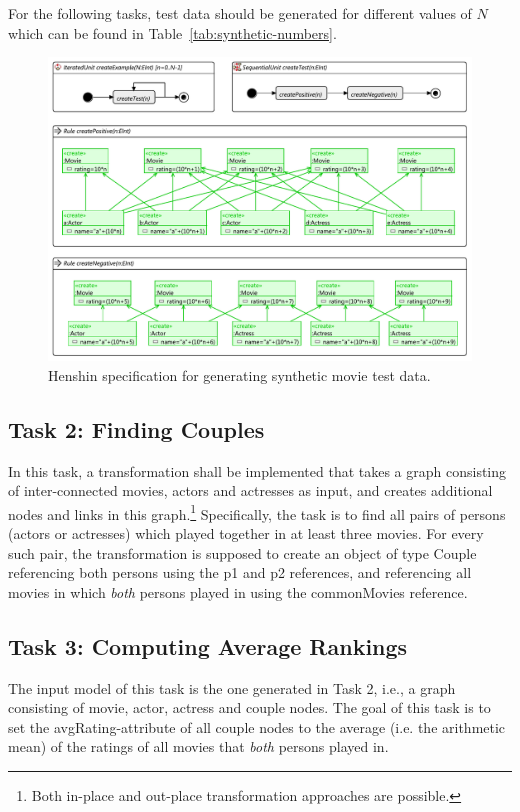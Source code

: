 \documentclass[a4paper,11pt]{article}
\newcommand{\p}[1]{\textsf{\small #1}}
\begin{document}
For the following tasks, test data should be generated for different values 
of $N$ which can be found in Table~\ref{tab:synthetic-numbers}.


\begin{figure}[p]
\centering
\includegraphics[scale=1.0,angle=90]{gen-test-data4}
\caption{Henshin specification for generating synthetic movie test data.}
\label{fig:gen-test-data}
\end{figure}

\subsection{Task 2: Finding Couples}

In this task, a transformation shall be implemented that takes a graph
consisting of inter-connected movies, actors and actresses as input, and
creates additional nodes and links in this graph.\footnote{Both in-place and
  out-place transformation approaches are possible.} Specifically, the task is
to find all pairs of persons (actors or actresses) which played together in at
least three movies.  For every such pair, the transformation is supposed to
create an object of type \p{Couple} referencing both persons using the
\p{p1} and \p{p2} references, and referencing all movies in which
\emph{both} persons played in using the \p{commonMovies} reference.

\subsection{Task 3: Computing Average Rankings}

The input model of this task is the one generated in Task 2,
i.e., a graph consisting of movie, actor, actress and couple
nodes. The goal of this task is to set the \p{avgRating}-attribute
of all couple nodes to the average (i.e. the
arithmetic mean) of the ratings of all movies that
\emph{both} persons played in.
\end{document}
